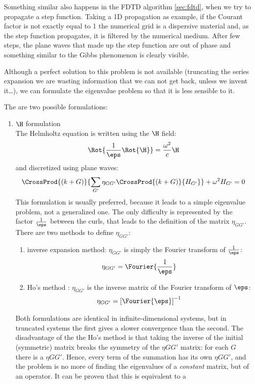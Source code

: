 Something similar also happens in the FDTD algorithm \ref{sec:fdtd},
when we try to propagate a step function. Taking a 1D propagation as
example, if the Courant factor is not exactly equal to 1 the numerical
grid is a dispersive material \cite{taflove_computational} and, as the
step function propagates, it is filtered by the numerical
medium. After few steps, the plane waves that made up the step
function are out of phase and something similar to the Gibbs
phenomenon is clearly visible.

Although a perfect solution to this problem is not available
(truncating the series expansion we are wasting information that we
can not get back, unless we invent it\ldots), we can formulate the
eigenvalue problem so that it is less sensible to it.

The are two possible formulations:
\begin{enumerate}
\item
  $\H$ formulation\\
  The Helmholtz equation is written using the $\H$ field:
  $$\Rot{\frac{1}{\eps}\Rot{\H}} = \frac{\omega^2}{c}\H$$
  and discretized using plane waves:
  $$\CrossProd{(k + G)}{\sum_{G'}\eta_{GG'} \CrossProd{(k + G)}{H_{G'}}} +
  \omega^2 H_{G'} = 0$$
  This formulation is usually preferred, because it leads to a simple
  eigenvalue problem, not a generalized one. The only difficulty is
  represented by the factor $\frac{1}{\eps}$ between the curls, that
  leads to the definition of the matrix $\eta_{GG'}$. There are two
  methods to define $\eta_{GG'}$:
  \begin{enumerate}
  \item
    inverse expansion method: $\eta_{GG'}$ is simply the Fourier
    transform of $\frac{1}{\eps}$:
    $$\eta_{GG'} = \Fourier{\frac{1}{\eps}}$$
  \item
    Ho's method \cite{ho_existence}: $\eta_{GG'}$ is the inverse
    matrix of the Fourier transform of $\eps$:
    $$\eta_{GG'} = \left[\Fourier{\eps}\right]^{-1}$$
  \end{enumerate}
  Both formulations are identical in infinite-dimensional systems, but
  in truncated systems the first gives a slower convergence than the
  second. The disadvantage of the the Ho's method is that taking the
  inverse of the initial (symmetric) matrix breaks the symmetry of the
  $\eta{GG'}$ matrix: for each $G$ there is a $\eta{GG'}$. Hence,
  every term of the summation has its own $\eta{GG'}$, and the problem
  is no more of finding the eigenvalues of a \emph{constant} matrix,
  but of an operator. It can be proven that this is equivalent to a

\end{enumerate}
